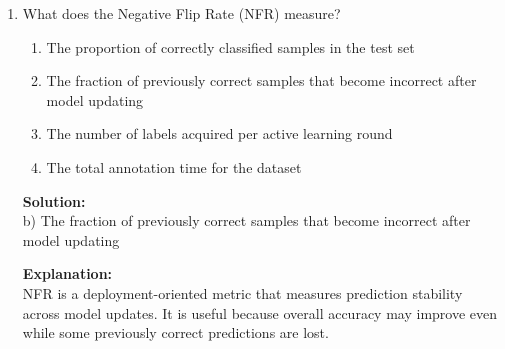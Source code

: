 \documentclass{article}
\begin{document}
\begin{enumerate}
\item What does the Negative Flip Rate (NFR) measure?

\begin{enumerate}
    \item The proportion of correctly classified samples in the test set
    \item The fraction of previously correct samples that become incorrect after model updating
    \item The number of labels acquired per active learning round
    \item The total annotation time for the dataset
\end{enumerate}

\textbf{Solution:} \\
b) The fraction of previously correct samples that become incorrect after model updating

\textbf{Explanation:} \\
NFR is a deployment-oriented metric that measures prediction stability across model updates. It is useful because overall accuracy may improve even while some previously correct predictions are lost.

\end{enumerate}
\end{document}
